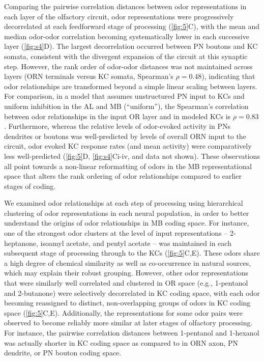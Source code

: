 \documentclass[12pt]{caltech_thesis}
\begin{document}
\begin{refsection}
Comparing the pairwise correlation distances between odor representations in each layer of the olfactory circuit, odor representations were progressively decorrelated at each feedforward stage of processing (\cref{fig:5}C), with the mean and median odor-odor correlation becoming systematically lower in each successive layer (\cref{fig:s4}D).
The largest decorrelation occurred between PN boutons and KC somata, consistent with the divergent expansion of the circuit at this synaptic step.
However, the rank order of odor-odor distances was not maintained across layers (ORN terminals versus KC somata, Spearman's $\rho{=}0.48$), indicating that odor relationships are transformed beyond a simple linear scaling between layers.
For comparison, in a model that assumes unstructured PN input to KCs and uniform inhibition in the AL and MB (``uniform''), the Spearman's correlation between odor relationships in the input OR layer and in modeled KCs is $\rho{=}0.83$.
Furthermore, whereas the relative levels of odor-evoked activity in PNs dendrites or boutons was well-predicted by levels of overall ORN input to the circuit, odor evoked KC response rates (and mean activity) were comparatively less well-predicted (\cref{fig:5}D, \cref{fig:s4}Ci-iv, and data not shown).
These observations all point towards a non-linear reformatting of odors in the MB representational space that alters the rank ordering of odor relationships compared to earlier stages of coding.

We examined odor relationships at each step of processing using hierarchical clustering of odor representations in each neural population, in order to better understand the origins of odor relationships in MB coding space.
For instance, one of the strongest odor clusters at the level of input representations – 2-heptanone, isoamyl acetate, and pentyl acetate – was maintained in each subsequent stage of processing through to the KCs (\cref{fig:5}C,E).
These odors share a high degree of chemical similarity as well as co-occurrence in natural sources, which may explain their robust grouping.
However, other odor representations that were similarly well correlated and clustered in OR space (e.g., 1-pentanol and 2-butanone) were selectively decorrelated in KC coding space, with each odor becoming reassigned to distinct, non-overlapping groups of odors in KC coding space (\cref{fig:5}C,E).
Additionally, the representations for some odor pairs were observed to become reliably more similar at later stages of olfactory processing.
For instance, the pairwise correlation distances between 1-pentanol and 1-hexanol was actually shorter in KC coding space as compared to in ORN axon, PN dendrite, or PN bouton coding space.


\end{refsection}
\end{document}
